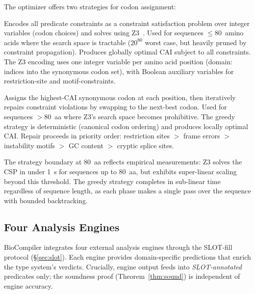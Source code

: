The optimizer offers two strategies for codon assignment:

\begin{description}[leftmargin=!,labelwidth=3.0cm,itemsep=2pt,topsep=2pt]
\item[Constraint-first (Z3 CSP):]
Encodes all predicate constraints as a constraint satisfaction problem
over integer variables (codon choices) and solves using
Z3~\cite{demoura2008z3}.  Used for sequences $\le 80$~amino acids where
the search space is tractable ($20^{80}$ worst case, but heavily
pruned by constraint propagation).  Produces globally optimal CAI
subject to all constraints.  The Z3 encoding uses one integer variable
per amino acid position (domain: indices into the synonymous codon
set), with Boolean auxiliary variables for restriction-site and
motif-constraints.

\item[CAI-first (greedy):]
Assigns the highest-CAI synonymous codon at each position, then
iteratively repairs constraint violations by swapping to the next-best
codon.  Used for sequences $> 80$~aa where Z3's search space becomes
prohibitive.  The greedy strategy is deterministic (canonical codon
ordering) and produces locally optimal CAI.  Repair proceeds in
priority order: restriction sites $>$ frame errors $>$ instability
motifs $>$ GC content $>$ cryptic splice sites.
\end{description}

The strategy boundary at 80~aa reflects empirical measurements: Z3
solves the CSP in under 1~s for sequences up to 80~aa, but exhibits
super-linear scaling beyond this threshold.  The greedy strategy
completes in sub-linear time regardless of sequence length, as each
phase makes a single pass over the sequence with bounded backtracking.

\subsection{Four Analysis Engines}\label{sec:engines}

BioCompiler integrates four external analysis engines through the SLOT-fill
protocol (\S\ref{sec:slot}).  Each engine provides domain-specific
predictions that enrich the type system's verdicts.  Crucially, engine
output feeds into \emph{SLOT-annotated} predicates only; the soundness
proof (Theorem~\ref{thm:sound}) is independent of engine accuracy.


